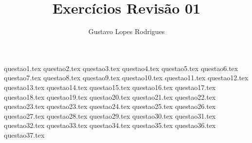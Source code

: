 \documentclass[10pt,a4paper]{article}
\author{Gustavo Lopes Rodrigues}
\title{Exercícios Revisão 01}
\begin{document}
	\maketitle
	
	{questao1.tex}
	{questao2.tex}
	{questao3.tex}
	{questao4.tex}
	{questao5.tex}
	{questao6.tex}
	{questao7.tex}
	{questao8.tex}
	{questao9.tex}
	{questao10.tex}
	{questao11.tex}
	{questao12.tex}
	{questao13.tex}
	{questao14.tex}
	{questao15.tex}
	{questao16.tex}
	{questao17.tex}
	{questao18.tex}
	{questao19.tex}
	{questao20.tex}
	{questao21.tex}
	{questao22.tex}
	{questao23.tex}
	{questao23.tex}
	{questao24.tex}
	{questao25.tex}
	{questao26.tex}
	{questao27.tex}
	{questao28.tex}
	{questao29.tex}
	{questao30.tex}
	{questao31.tex}
	{questao32.tex}
	{questao33.tex}
	{questao34.tex}
	{questao35.tex}
	{questao36.tex}
	{questao37.tex}
	
\end{document}
